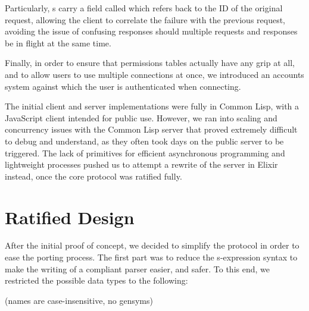 \documentclass[format=sigconf]{acmart}
\begin{document}
Particularly, s carry a field called  which refers back to the ID of the original request, allowing the client to correlate the failure with the previous request, avoiding the issue of confusing responses should multiple requests and responses be in flight at the same time.

Finally, in order to ensure that permissions tables actually have any grip at all, and to allow users to use multiple connections at once, we introduced an accounts system against which the user is authenticated when connecting.

The initial client and server implementations were fully in Common Lisp, with a JavaScript client intended for public use. However, we ran into scaling and concurrency issues with the Common Lisp server that proved extremely difficult to debug and understand, as they often took days on the public server to be triggered. The lack of primitives for efficient asynchronous programming and lightweight processes pushed us to attempt a rewrite of the server in Elixir instead, once the core protocol was ratified fully.
      
\section{Ratified Design}\label{ratified-design}
After the initial proof of concept, we decided to simplify the protocol in order to ease the porting process. The first part was to reduce the s-expression syntax to make the writing of a compliant parser easier, and safer. To this end, we restricted the possible data types to the following:

\begin{step}
\item {}
  \begin{step}
  \item {}
  \item {}
  \end{step}
\item {} (names are case-insensitive, no gensyms)
  \begin{step}
  \item {}
  \item {}
  \end{step}
\item {}
\item {}
\end{step}
\end{document}
